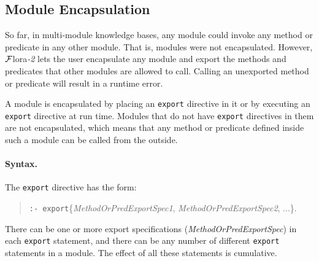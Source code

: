 \documentclass[11pt]{article}
\newcommand{\FLORA}{{\mbox{\sc ${\cal F}${lora}\rm\emph{-2}}}\xspace}
\newcommand{\FLSYSTEM}{\FLORA}
\begin{document}
\subsection{Module Encapsulation}\label{sec-module-encap}

So far, in multi-module knowledge bases, any module could invoke any method or
predicate in any other module. That is, modules were not encapsulated.
However, \FLSYSTEM lets the user encapsulate any module and export the
methods and predicates that other modules are allowed to call. Calling
an unexported method or predicate will result in a runtime error.

A module is encapsulated by placing an {\tt export} directive in it or by
executing an {\tt export} directive at run time.  Modules that do not have
{\tt export} directives in them are not encapsulated, which means that any
method or predicate defined inside such a module can be called from the outside.

\paragraph{Syntax.}
The {\tt export} directive has the form:
\begin{quote}
  {\tt :- export}\{\emph{MethodOrPredExportSpec1},
  \emph{MethodOrPredExportSpec2}, ...\}.
\end{quote}
There can be one or more export specifications
(\emph{MethodOrPredExportSpec}) in each {\tt export} statement, and there
can be any number of different {\tt export} statements in a module. The
effect of all 
these statements is cumulative.   
\end{document}
